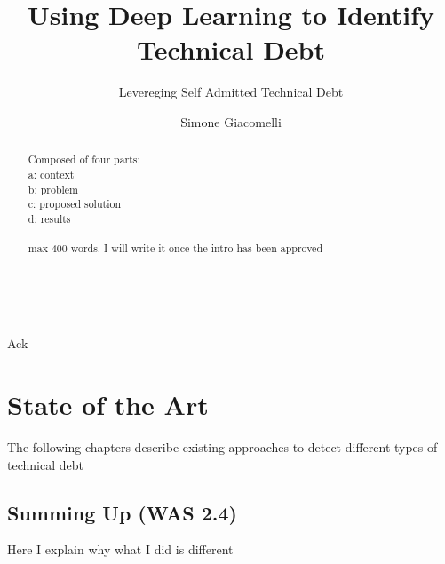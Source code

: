 \documentclass[11pt, mscthesis]{usiinfthesis}
\title{Using Deep Learning to Identify Technical Debt} %
\subtitle{Levereging Self Admitted Technical Debt} %
\author{Simone Giacomelli} %
\begin{document}
\maketitle %

\frontmatter %

\begin{abstract}
Composed of four parts: \\
a: context\\
b: problem\\
c: proposed solution\\
d: results\\
\\
max 400 words.
I will write it once the intro has been approved
\\
\\
\\

\end{abstract}



\begin{acknowledgements}
Ack 
\end{acknowledgements}

\tableofcontents 
\listoffigures %
\listoftables %

\mainmatter




\chapter{State of the Art}
The following chapters describe existing approaches to detect different types of technical debt







\section{Summing Up (WAS 2.4)}
Here I explain why what I did is different

\end{document}
